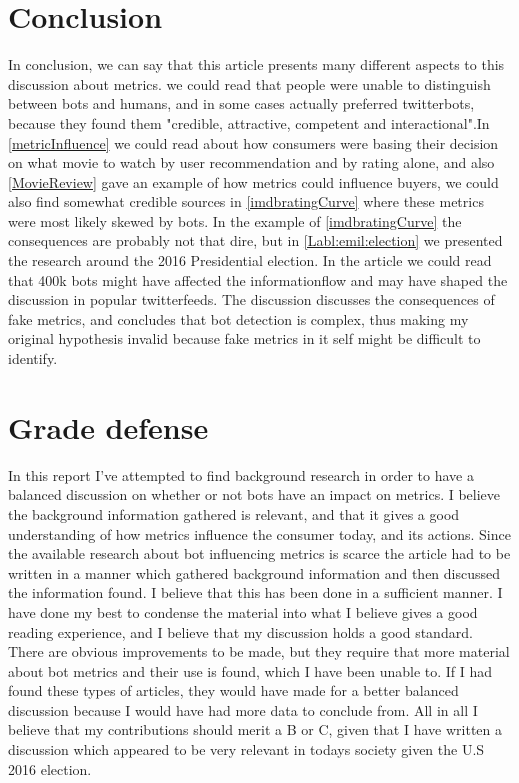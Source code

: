 \section{Conclusion}
In conclusion, we can say that this article presents many different aspects to this discussion about metrics. we could read that people were unable to distinguish between bots and humans, and in some cases actually preferred twitterbots, because they found them "credible, attractive, competent and interactional"\cite{Edwards2014372}.In \ref{metricInfluence} we could read about how consumers were basing their decision on what movie to watch by user recommendation and by rating alone, and also \ref{MovieReview} gave an example of how metrics could influence buyers, we could also find somewhat credible sources in \ref{imdbratingCurve} where these metrics were most likely skewed by bots. In the example of \ref{imdbratingCurve} the consequences are probably not that dire, but in \ref{Labl:emil:election} we presented the research around the 2016 Presidential election. In the article we could read that 400k bots might have affected the informationflow and may have shaped the discussion in popular twitterfeeds. The discussion discusses the consequences of fake metrics, and concludes that bot detection is complex, thus making my original hypothesis invalid because fake metrics in it self might be difficult to identify. 



\section{Grade defense}
In this report I've attempted to find background research in order to have a balanced discussion on whether or not bots have an impact on metrics. I believe the background information gathered is relevant, and that it gives a good understanding of how metrics influence the consumer today, and its actions. Since the available research about bot influencing metrics is scarce the article had to be written in a manner which gathered background information and then discussed the information found. I believe that this has been done in a sufficient manner. I have done my best to condense the material into what I believe gives a good reading experience, and I believe that my discussion holds a good standard. There are obvious improvements to be made, but they require that more material about bot metrics and their use is found, which I have been unable to. If I had found these types of articles, they would have made for a better balanced discussion because I would have had more data to conclude from. All in all I believe that my contributions should merit a B or C, given that I have written a discussion which appeared to be very relevant in todays society given the U.S 2016 election. 


